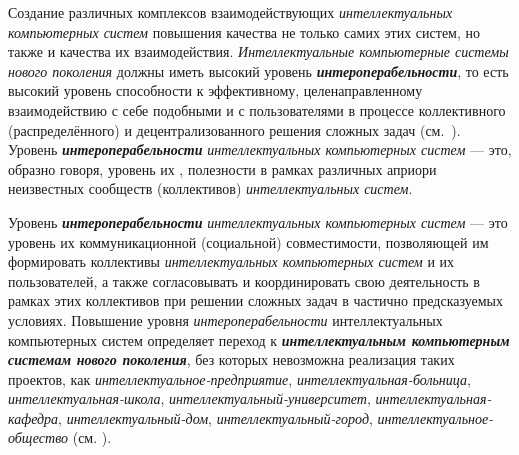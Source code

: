 Создание различных комплексов взаимодействующих \textit{интеллектуальных компьютерных систем}  повышения качества не только самих этих систем, но также и качества их взаимодействия. \textit{Интеллектуальные компьютерные системы нового поколения} должны иметь высокий уровень \textbf{\textit{интероперабельности}}, то есть высокий уровень способности к эффективному, целенаправленному взаимодействию с себе подобными и с пользователями в процессе коллективного (распределённого) и децентрализованного решения сложных задач (см.~). Уровень \textbf{\textit{интероперабельности}} \textit{интеллектуальных компьютерных систем} --- это, образно говоря, уровень их , полезности в рамках различных априори неизвестных сообществ (коллективов) \textit{интеллектуальных систем}.

Уровень \textbf{\textit{интероперабельности}} \textit{интеллектуальных компьютерных систем} --- это уровень их коммуникационной (социальной) совместимости, позволяющей им  формировать коллективы \textit{интеллектуальных компьютерных систем} и их пользователей, а также  согласовывать и координировать свою деятельность в рамках этих коллективов при решении сложных задач в частично предсказуемых условиях. Повышение уровня \textit{интероперабельности} интеллектуальных компьютерных систем определяет переход к \textbf{\textit{интеллектуальным компьютерным системам нового поколения}}, без которых невозможна реализация таких проектов, как \textit{интеллектуальное-предприятие}, \textit{интеллектуальная-больница}, \textit{интеллектуальная-школа}, \textit{интеллектуальный-университет}, \textit{интеллектуальная-кафедра}, \textit{интеллектуальный-дом}, \textit{интеллектуальный-город}, \textit{интеллектуаль\-ное-общество} (см. ).


